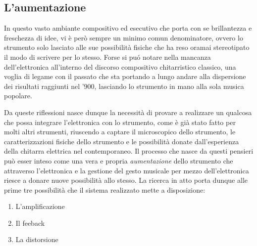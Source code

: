 \documentclass[oneside]{article}
\begin{document}
\begin{multicols*}{2}

\section{ L’aumentazione}
\noindent

In questo vasto ambiante compositivo ed esecutivo che porta con se brillantezza e freschezza di idee, vi è però sempre un minimo comun denominatore, ovvero lo strumento solo lasciato alle sue possibilità fisiche che ha reso oramai stereotipato il modo di scrivere per lo stesso. Forse si puó notare nella mancanza dell'elettronica all'interno del discorso compositivo chitarristico classico, una voglia di legame con il passato che sta portando a lungo andare alla dispersione dei risultati raggiunti nel '900, lasciando lo strumento in mano alla sola musica popolare.\newline\newline

\noindent Da queste riflessioni nasce dunque la necessità di provare a realizzare un qualcosa che possa integrare l'elettronica con lo strumento, come è già stato fatto per molti altri strumenti, riuscendo a captare il microscopico dello strumento, le caratterizzazioni fisiche dello strumento e le possibilità donate dall'esperienza della chitarra elettrica nel contemporaneo. Il processo che nasce da questi pensieri può esser inteso come una vera e propria \textit{aumentazione} dello strumento che attraverso l'elettronica e la gestione del gesto musicale per mezzo dell'elettronica riesce a donare nuove possibilità allo stesso. La ricerca in atto porta dunque alle prime tre possibilità che il sistema realizzato mette a disposizione: 
\begin{enumerate}[label=(\roman*)]
\item L'amplificazione
\item Il feeback 
\item La distorsione
\end{enumerate}


\end{multicols*}
\end{document}
